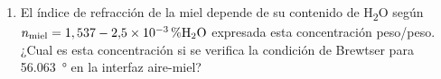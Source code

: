 \documentclass[11pt,spanish,a4paper,twoside]{article}
\begin{document}
\begin{enumerate}
\item
El índice de refracción de la miel depende de su contenido de H\textsubscript{2}O según \(n_{\mathrm{miel}}= 1,537- \SI{2,5E-3}{\percent}\mathrm{H\textsubscript{2}O}\) expresada esta concentración peso/peso.
¿Cual es esta concentración si se verifica la condición de Brewtser para \SI{56.063}{\degree} en la interfaz aire-miel?

%
% 
%
%
%
%
%
%
%
%
%
%


\end{enumerate}
\end{document}
